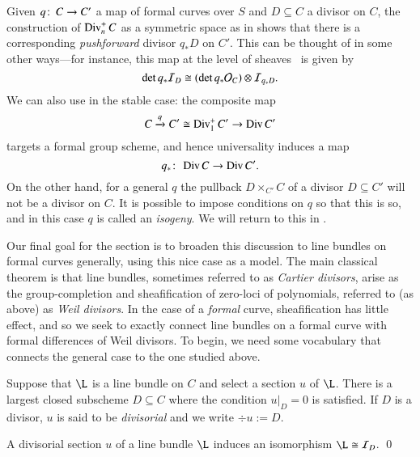 \begin{remark}\label{DivHasPushforwards}
Given $q\colon\thinspace C \to C'$ a map of formal curves over $S$ and $D \subseteq C$ a divisor on $C$, the construction of $\operatorname{Div}_n^+ C$ as a symmetric space as in  shows that there is a corresponding \textit{pushforward} divisor $q_* D$ on $C'$.  This can be thought of in some other ways---for instance, this map at the level of sheaves~\cite[Ch.\ IV, Exercise 2.6]{Hartshorne} is given by \[\det q_* \mathcal{I}_D \cong (\det q_* \mathcal{O}_C) \otimes \mathcal{I}_{q_* D}.\]  We can also use  in the stable case: the composite map \[C \xrightarrow{q} C' \cong \operatorname{Div}_1^+ C' \to \operatorname{Div} C'\] targets a formal group scheme, and hence universality induces a map \[q_*\colon\thinspace \operatorname{Div} C \to \operatorname{Div} C'.\]  On the other hand, for a general $q$ the pullback $D \times_{C'} C$ of a divisor $D \subseteq C'$ will not be a divisor on $C$.  It is possible to impose conditions on $q$ so that this is so, and in this case $q$ is called an \textit{isogeny}.  We will return to this in .
\end{remark}

Our final goal for the section is to broaden this discussion to line bundles on formal curves generally, using this nice case as a model.  The main classical theorem is that line bundles, sometimes referred to as \textit{Cartier divisors}, arise as the group-completion and sheafification of zero-loci of polynomials, referred to (as above) as \textit{Weil divisors}.  In the case of a \emph{formal} curve, sheafification has little effect, and so we seek to exactly connect line bundles on a formal curve with formal differences of Weil divisors.  To begin, we need some vocabulary that connects the general case to the one studied above.

\begin{definition}\label{DivisorialDefn}
Suppose that $\L$ is a line bundle on $C$ and select a section $u$ of $\L$.  There is a largest closed subscheme $D \subseteq C$ where the condition $u|_D = 0$ is satisfied.  If $D$ is a divisor, $u$ is said to be \textit{divisorial} and we write $\div u := D$.
\end{definition}

\begin{lemma}
A divisorial section $u$ of a line bundle $\L$ induces an isomorphism $\L \cong \sheaf I_D$. \qed
\end{lemma}

